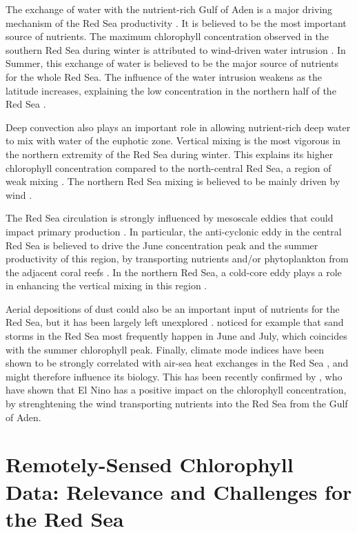 The exchange of water with the nutrient-rich Gulf of Aden is a major driving
mechanism of the Red Sea productivity \citep{Triantafyllou2014}. It is believed
to be the most important source of nutrients. The maximum chlorophyll
concentration observed in the southern Red Sea during winter is attributed to
wind-driven water intrusion \citep{Raitsos2013, Yao2014}. In Summer, this
exchange of water is believed to be the major source of nutrients for the whole
Red Sea. The influence of the water intrusion weakens as the latitude
increases, explaining the low concentration in the northern half of the Red Sea
\citep{Raitsos2013}.

Deep convection also plays an important role in allowing nutrient-rich deep
water to mix with water of the euphotic zone. Vertical mixing is the most
vigorous in the northern extremity of the Red Sea during winter. This
explains its higher chlorophyll concentration compared to the north-central Red
Sea, a region of weak mixing \citep{Raitsos2013}. The northern Red Sea mixing
is believed to be mainly driven by wind \citep{Raitsos2013}.

The Red Sea circulation is strongly influenced by mesoscale eddies
\citep{Yao2014, Yao2014b, Zhan2014} that could impact primary production
\citep{Zhai2013}. In particular, the anti-cyclonic eddy in the central Red Sea
is believed to drive the June concentration peak and the summer productivity
of this region, by transporting nutrients and/or phytoplankton from the
adjacent coral reefs \citep{Raitsos2013}. In the northern Red Sea, a cold-core
eddy plays a role in enhancing the vertical mixing in this region
\citep{Raitsos2013}.

Aerial depositions of dust could also be an important input of nutrients for
the Red Sea, but it has been largely left unexplored \citep{Triantafyllou2014}.
\citet{Raitsos2013} noticed for example that sand storms in the Red Sea most
frequently happen in June and July, which coincides with the summer chlorophyll
peak. Finally, climate mode indices have been shown to be strongly correlated
with air-sea heat exchanges in the Red Sea \citep{Abualnaja2015}, and might
therefore influence its biology. This has been recently confirmed by
\citet{Raitsos2015}, who have shown that El Nino has a positive impact on the
chlorophyll concentration, by strenghtening the wind transporting nutrients
into the Red Sea from the Gulf of Aden.

\section{Remotely-Sensed Chlorophyll Data: Relevance and Challenges for the Red
Sea}

